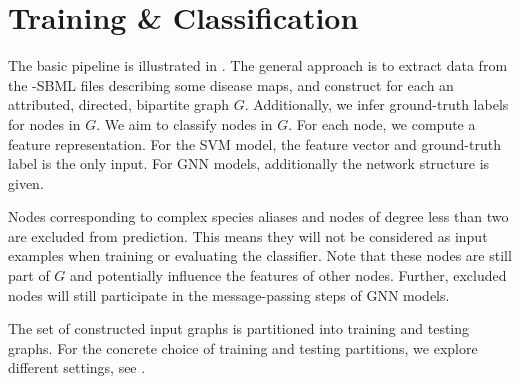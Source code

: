 \documentclass[
	fontsize=10pt, %
	twoside=false, %
	secnumdepth=1, %
  toc=indentunnumbered %
]{kaobook}
\begin{document}




\section{Training \& Classification}
\label{sec:classification}


The basic pipeline is illustrated in . The general
approach is to extract data from the -SBML files
describing some disease maps, and construct for each an attributed, directed,
bipartite graph $G$. Additionally, we infer ground-truth labels for nodes in
$G$. We aim to classify nodes in $G$. For each node, we compute a feature
representation. For the SVM model, the feature vector and ground-truth label is
the only input. For GNN models, additionally the network structure is given.

Nodes corresponding to complex species aliases and nodes of degree less than two
are excluded from prediction. This means they will not be considered as input
examples when training or evaluating the classifier. Note that these nodes are
still part of $G$ and potentially influence the features of other nodes.
Further, excluded nodes will still participate in the message-passing steps of
GNN models.

The set of constructed input graphs is partitioned into training and
testing graphs. For the concrete choice of training and testing partitions, we
explore different settings, see .





\end{document}
